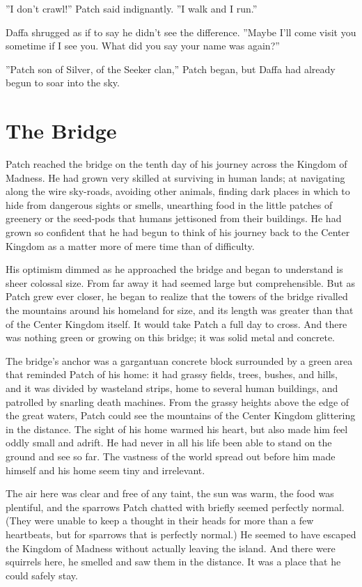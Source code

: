 \documentclass[12pt]{book}
\begin{document}
''I don't crawl!'' Patch said indignantly. ''I walk and I run.''

Daffa shrugged as if to say he didn't see the difference. ''Maybe I'll come visit you sometime if I see you. What did you say your name was again?''

''Patch son of Silver, of the Seeker clan,'' Patch began, but Daffa had already begun to soar into the sky.


\section{The Bridge}

Patch reached the bridge on the tenth day of his journey across the Kingdom of Madness. He had grown very skilled at surviving in human lands; at navigating along the wire sky-roads, avoiding other animals, finding dark places in which to hide from dangerous sights or smells, unearthing food in the little patches of greenery or the seed-pods that humans jettisoned from their buildings. He had grown so confident that he had begun to think of his journey back to the Center Kingdom as a matter more of mere time than of difficulty.

His optimism dimmed as he approached the bridge and began to understand is sheer colossal size. From far away it had seemed large but comprehensible. But as Patch grew ever closer, he began to realize that the towers of the bridge rivalled the mountains around his homeland for size, and its length was greater than that of the Center Kingdom itself. It would take Patch a full day to cross. And there was nothing green or growing on this bridge; it was solid metal and concrete.

The bridge's anchor was a gargantuan concrete block surrounded by a green area that reminded Patch of his home: it had grassy fields, trees, bushes, and hills, and it was divided by wasteland strips, home to several human buildings, and patrolled by snarling death machines. From the grassy heights above the edge of the great waters, Patch could see the mountains of the Center Kingdom glittering in the distance. The sight of his home warmed his heart, but also made him feel oddly small and adrift. He had never in all his life been able to stand on the ground and see so far. The vastness of the world spread out before him made himself and his home seem tiny and irrelevant.

The air here was clear and free of any taint, the sun was warm, the food was plentiful, and the sparrows Patch chatted with briefly seemed perfectly normal. (They were unable to keep a thought in their heads for more than a few heartbeats, but for sparrows that is perfectly normal.) He seemed to have escaped the Kingdom of Madness without actually leaving the island. And there were squirrels here, he smelled and saw them in the distance. It was a place that he could safely stay.
\end{document}
